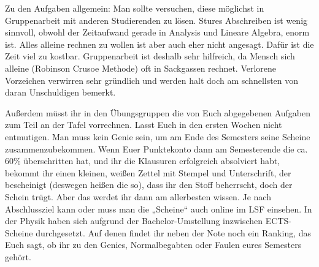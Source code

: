 Zu den Aufgaben allgemein: Man sollte versuchen, diese möglichst in Gruppenarbeit mit anderen Studierenden zu lösen. Stures Abschreiben ist wenig sinnvoll, obwohl der Zeitaufwand gerade in Analysis und Lineare Algebra, enorm ist. Alles alleine rechnen zu wollen ist aber auch eher nicht angesagt. Dafür ist die Zeit viel zu kostbar. Gruppenarbeit ist deshalb sehr hilfreich, da Mensch sich alleine (Robinson Crusoe Methode) oft in Sackgassen rechnet. Verlorene Vorzeichen verwirren sehr gründlich und werden halt doch am schnellsten von daran Unschuldigen bemerkt.


Außerdem müsst ihr in den Übungsgruppen die von Euch abgegebenen Aufgaben zum Teil an der Tafel vorrechnen. Lasst Euch in den ersten Wochen nicht entmutigen. Man muss kein Genie sein, um am Ende des Semesters seine Scheine zusammenzubekommen. Wenn Euer Punktekonto dann am Semesterende die ca. 60\% überschritten hat, und ihr die Klausuren erfolgreich absolviert habt, bekommt ihr einen kleinen, weißen Zettel mit Stempel und Unterschrift, der bescheinigt (deswegen heißen die so), dass ihr den Stoff beherrscht, doch der Schein trügt. Aber das werdet ihr dann am allerbesten wissen. Je nach Abschlussziel kann oder muss man die „Scheine“ auch online im LSF einsehen. In der Physik haben sich aufgrund der Bachelor-Umstellung inzwischen ECTS-Scheine durchgesetzt. Auf denen findet ihr neben der Note noch ein Ranking, das Euch sagt, ob ihr zu den Genies, Normalbegabten oder Faulen eures Semesters gehört.
